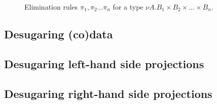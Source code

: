 \begin{figure}
\caption{Elimination rules $\pi_1, \pi_2 \ldots \pi_n$ for a type $\nu A. B_1 \times B_2 \times \ldots \times B_n$.}
\label{fig:nuA_elim_rules}
\end{figure}

\subsection{Desugaring (co)data}


\subsection{Desugaring left-hand side projections}


\subsection{Desugaring right-hand side projections}
